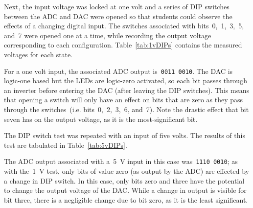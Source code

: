 Next, the input voltage was locked at one volt and a series of DIP switches between the ADC and DAC were opened so that students could observe the effects of a changing digital input.  The switches associated with bits~0,~1,~3,~5, and~7 were opened one at a time, while recording the output voltage corresponding to each configuration.  Table~\ref{tab:1vDIPs} contains the measured voltages for each state.
%
\begin{table}[H]
	\centering
	
	\parbox{.6\textwidth}{
	\caption[\SI{1}{\volt}DC DIP Switches]{Measured output for various DIP switch configurations with a~\SI{1}{\volt} input.}
	\label{tab:1vDIPs}}
\end{table}
%
For a one volt input, the associated ADC output is~\texttt{0011 0010}.  The DAC is logic-one based but the LEDs are logic-zero activated, so each bit passes through an inverter before entering the DAC (after leaving the DIP switches).  This means that opening a switch will only have an effect on bits that are zero as they pass through the switches~(i.e. bits~0,~2,~3,~6, and~7).  Note the drastic effect that bit seven has on the output voltage, as it is the most-significant bit.

The DIP switch test was repeated with an input of five volts.  The results of this test are tabulated in Table~\ref{tab:5vDIPs}.
%
\begin{table}[H]
	\centering
	
	\parbox{.6\textwidth}{
	\caption[]{}
	\label{tab:5vDIPs}}
\end{table}
%
The ADC output associated with a~\SI{5}{\volt} input in this case was~\texttt{1110 0010}; as with the~\SI{1}{\volt} test, only bits of value zero (as output by the ADC) are effected by a change in DIP switch.  In this case, only bits zero and three have the potential to change the output voltage of the DAC.  While a change in output is visible for bit three, there is a negligible change due to bit zero, as it is the least significant.



